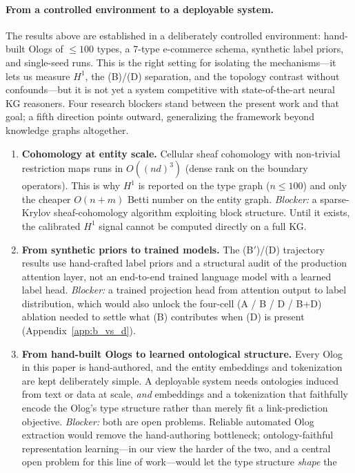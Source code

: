 \paragraph{From a controlled environment to a deployable system.}
The results above are established in a deliberately controlled
environment: hand-built Ologs of $\leq 100$ types, a 7-type e-commerce
schema, synthetic label priors, and single-seed runs. This is the right
setting for isolating the mechanisms---it lets us measure $H^1$, the
(B)/(D) separation, and the topology contrast without confounds---but it
is not yet a system competitive with state-of-the-art neural KG
reasoners. Four research blockers stand between the present work and
that goal; a fifth direction points outward, generalizing the framework
beyond knowledge graphs altogether.
\begin{enumerate}
\item \textbf{Cohomology at entity scale.} Cellular sheaf cohomology with
non-trivial restriction maps runs in $O((nd)^3)$ (dense rank on the
boundary operators). This is why $H^1$ is reported on the type graph
($n \leq 100$) and only the cheaper $O(n+m)$ Betti number on the
entity graph. \emph{Blocker:} a sparse-Krylov sheaf-cohomology
algorithm exploiting block structure. Until it exists, the calibrated
$H^1$ signal cannot be computed directly on a full KG.
\item \textbf{From synthetic priors to trained models.} The (B$'$)/(D)
trajectory results use hand-crafted label priors and a structural audit
of the production attention layer, not an end-to-end trained language
model with a learned label head. \emph{Blocker:} a trained projection
head from attention output to label distribution, which would also
unlock the four-cell (A / B / D / B+D) ablation needed to settle what
(B) contributes when (D) is present (Appendix~\ref{app:b_vs_d}).
\item \textbf{From hand-built Ologs to learned ontological structure.}
Every Olog in this paper is hand-authored, and the entity embeddings and
tokenization are kept deliberately simple. A deployable system needs
ontologies induced from text or data at scale, \emph{and} embeddings and
a tokenization that faithfully encode the Olog's type structure rather
than merely fit a link-prediction objective. \emph{Blocker:} both are
open problems. Reliable automated Olog extraction would remove the
hand-authoring bottleneck; ontology-faithful representation
learning---in our view the harder of the two, and a central open problem
for this line of work---would let the type structure \emph{shape} the

\end{enumerate}
